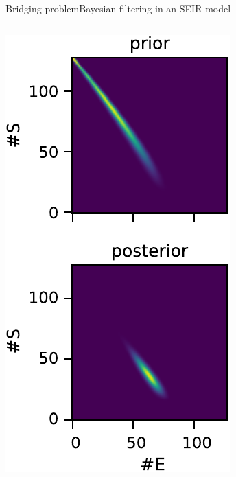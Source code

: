 \documentclass[9pt]{beamer}
\newcommand{\bottomcite}[1]{\vspace*{\fill} {\scriptsize \parencite{#1}}}
\begin{document}
\begin{frame}{Bridging problem}{Bayesian filtering in an SEIR model}
\begin{columns}
\begin{column}{.25\paperwidth}
            \includegraphics[width=.8\textwidth]{../gfx/prior_posterior_vert.pdf}
        \end{column}
    \end{columns}
    \bottomcite{backenkohler2020analysis}
\end{frame}
    
\end{document}
